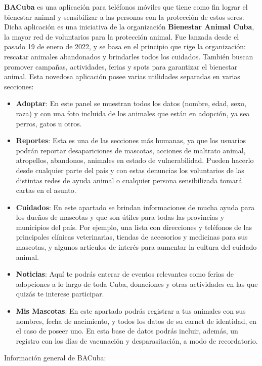 \textbf{ BACuba}  es una aplicación para teléfonos móviles que tiene como fin lograr el bienestar animal y sensibilizar a las personas con la protección de estos seres. Dicha aplicación es una iniciativa de la organización \textbf{Bienestar Animal Cuba}, la mayor red de voluntarios para la protección animal. Fue lanzada desde el pasado 19 de enero de 2022, y se basa en el principio que rige la organización: rescatar animales abandonados y brindarles todos los cuidados. También buscan promover campañas, actividades, ferias y spots para garantizar el bienestar animal. Esta novedosa aplicación posee varias utilidades separadas en varias secciones:
\begin{itemize}
	\item \textbf {Adoptar}: En este panel se muestran todos los datos (nombre, edad, sexo, raza) y con una foto incluida de los animales que están en adopción, ya sea perros, gatos u otros.
	\item \textbf{Reportes}: Esta es una de las secciones más humanas, ya que los usuarios podrán reportar desapariciones de mascotas, acciones de maltrato animal, atropellos, abandonos, animales en estado de vulnerabilidad. Pueden hacerlo desde cualquier parte del país y con estas denuncias los voluntarios de las distintas redes de ayuda animal o cualquier persona sensibilizada tomará cartas en el asunto.
	\item \textbf{Cuidados}: En este apartado se brindan informaciones de mucha ayuda para los dueños de mascotas y que son útiles para todas las provincias y municipios del país. Por ejemplo, una lista con direcciones y teléfonos de las principales clínicas veterinarias, tiendas de accesorios y medicinas para sus mascotas, y algunos artículos de interés para aumentar la cultura del cuidado animal.
	\item \textbf{Noticias}: Aquí te podrás enterar de eventos relevantes como ferias de adopciones a lo largo de toda Cuba, donaciones y otras actividades en las que quizás te interese participar.
	\item \textbf{Mis Mascotas}: En este apartado podrás registrar a tus animales con sus nombres, fecha de nacimiento, y todos los datos de su carnet de identidad, en el caso de poseer uno. En esta base de datos podrás incluir, además, un registro con los días de vacunación y desparasitación, a modo de recordatorio.
\end{itemize}

Información general de BACuba:

